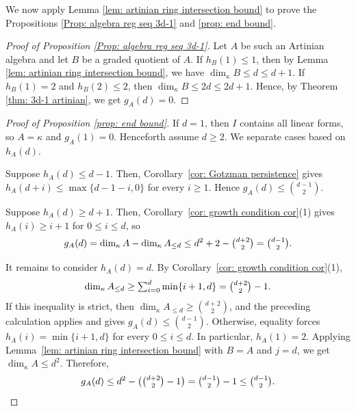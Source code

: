 \documentclass[11pt]{amsart}
\newtheorem{lemma}[theorem]{Lemma}
\theoremstyle{definition}
\newenvironment{customprop}[1]
  {\renewcommand\theinnercustomprop{#1}\innercustomprop}
  {\endinnercustomprop}
\newcommand{\Agz}{A(\Gamma)}
\newcommand{\gz}{\Gamma}
\newcommand{\PPP}{\mathbb{P}}
\newcommand{\dimk}{\dim_{\kappa}}
\newcommand{\tsum}{\mathop{\textstyle\sum}\nolimits}
\begin{document}
We now apply Lemma \ref{lem: artinian ring intersection bound} to prove the Propositions \ref{Prop: algebra reg seq 3d-1} and \ref{prop: end bound}.
\begin{proof}[Proof of Proposition \ref{Prop: algebra reg seq 3d-1}]
Let $A$ be such an Artinian algebra and let $B$ be a graded quotient of $A$. If $h_B(1) \leq 1$, then by Lemma \ref{lem: artinian ring intersection bound}, we have $\dimk B \leq d \leq d+1$. If $h_B(1)=2$ and $h_B(2) \le 2$, then $\dimk B \leq 2d \leq 2d+1$. Hence, by Theorem \ref{thm: 3d-1 artinian}, we get $g_A(d)=0$.
\end{proof}

\begin{proof}[Proof of Proposition \ref{prop: end bound}]
If $d=1$, then $I$ contains all linear forms, so $A=\kappa$ and $g_A(1)=0$. Henceforth assume $d\geq2$.
We separate cases based on $h_A(d)$.

Suppose $h_A(d)\leq d-1$. Then, Corollary~\ref{cor: Gotzman persistence} gives
$h_A(d+i)\leq \max\{d-1-i,0\}$ for every $i\geq 1$.
Hence $g_A(d)\leq \binom{d-1}{2}$.

Suppose $h_A(d)\geq d+1$. Then,  Corollary~\ref{cor: growth condition cor}(1) gives
$h_A(i)\geq i+1$ for $0\leq i\leq d$, so
\[
g_A(d)=\dim_\kappa A-\dim_\kappa A_{\leq d}
\leq d^2+2-\tbinom{d+2}{2}
=\tbinom{d-1}{2}.
\]

It remains to consider $h_A(d)=d$. By Corollary~\ref{cor: growth condition cor}(1),
\[
\dim_\kappa A_{\leq d}
\geq \tsum_{i=0}^{d}\min\{i+1,d\}
=\tbinom{d+2}{2}-1.
\]
If this inequality is strict, then
$\dim_\kappa A_{\leq d}\geq \binom{d+2}{2}$,
and the preceding calculation applies and gives $g_A(d) \leq \binom{d-1}{2}$. Otherwise, equality forces
$h_A(i)=\min\{i+1,d\}$ for every $0\leq i\leq d$.
In particular, $h_A(1)=2$. Applying Lemma~\ref{lem: artinian ring intersection bound} with $B=A$ and $j=d$,
we get $\dim_\kappa A\leq d^2$. Therefore,
\[
g_A(d)
\leq d^2-\big(\tbinom{d+2}{2}-1\big)
=\tbinom{d-1}{2}-1
\leq \tbinom{d-1}{2}. \qedhere
\]
\end{proof}




\end{document}
